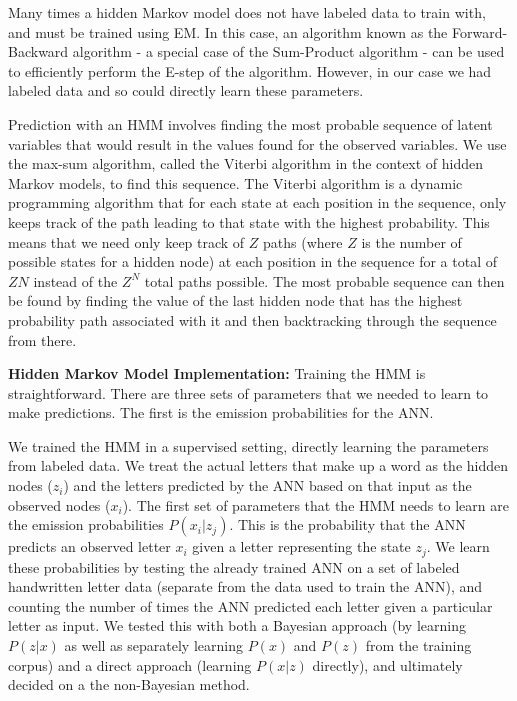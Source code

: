 \documentclass[11pt,letterpaper]{article}
\begin{document}
Many times a hidden Markov model does not have labeled data to train with, and must be trained using EM\@. In
this case, an algorithm known as the Forward-Backward algorithm - a special case of the Sum-Product algorithm -
can be used to efficiently perform the E-step of the algorithm. However, in our case we had labeled data
and so could directly learn these parameters.

Prediction with an HMM involves finding the most probable sequence of latent variables
that would result in the values found for the observed variables. We use the max-sum
algorithm, called the Viterbi algorithm in the context of hidden Markov models, to
find this sequence. The Viterbi algorithm is a dynamic programming algorithm that
for each state at each position in the sequence, only keeps track of the path leading
to that state with the highest probability. This means that we need only keep track of
$Z$ paths (where $Z$ is the number of possible states for a hidden node) at each position
in the sequence for a total of $Z N$ instead of the $Z^N$ total paths possible. The most
probable sequence can then be found by finding the value of the last hidden node that has
the highest probability path associated with it and then backtracking through the sequence
from there.


{\bf Hidden Markov Model Implementation:} Training the HMM is straightforward. There are three sets of parameters
that we needed to learn to make predictions. The first is the emission
probabilities for the ANN\@. 


We trained the HMM in a supervised setting, directly learning the parameters
from labeled data. We treat the actual letters that make up a word as the
hidden nodes ($z_i$) and the letters predicted by the ANN based on that
input as the observed nodes ($x_i$). The first set of parameters that the HMM
needs to learn are the emission probabilities $P(x_i | z_j)$. This is the probability
that the ANN predicts an observed letter $x_i$ given a letter representing
the state $z_j$. We learn these probabilities by testing the already
trained ANN on a set of labeled handwritten letter data (separate from the
data used to train the ANN), and counting the number of times the ANN predicted
each letter given a particular letter as input. We tested this with both a Bayesian
approach (by learning $P(z|x)$ as well as separately learning $P(x)$ and $P(z)$
from the training corpus) and a direct approach (learning $P(x|z)$ directly), and ultimately
decided on a the non-Bayesian method.
\end{document}
